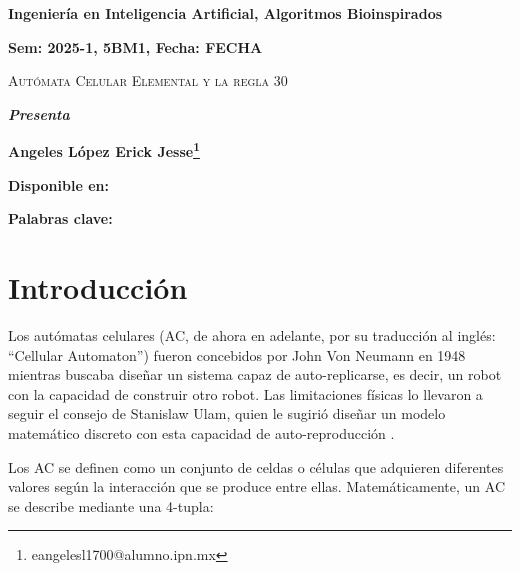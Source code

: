 \documentclass[12pt,twoside]{article}
\newcommand{\keywords}[1]{%
	\begin{center}
		\textbf{Palabras clave:} #1
	\end{center}
}
\begin{document}
	
	\centerline{\bf Ingeniería en Inteligencia Artificial, Algoritmos Bioinspirados}
	
	\centerline{\bf  Sem: 2025-1, 5BM1, Fecha: FECHA}
	
	\centerline{}
	
	
	
	\begin{center}
		\Large{\textsc{Autómata Celular Elemental y la regla 30}} 
	\end{center}
	\centerline{}
	\centerline{\bf {\textit{Presenta}}}
	\centerline{\bf {Angeles López Erick Jesse\footnote{eangelesl1700@alumno.ipn.mx}}}
	\centerline{}
	\centerline{}
	\centerline{\bf {Disponible en:}}
	\centerline{}
	
	
	
	
	\newtheorem{Theorem}{\quad Theorem}[section]
	
	\newtheorem{Definition}[Theorem]{\quad Definition}
	
	\newtheorem{Corollary}[Theorem]{\quad Corollary}
	
	\newtheorem{Lemma}[Theorem]{\quad Lemma}
	
	\newtheorem{Example}[Theorem]{\quad Example}
	
	\bigskip
	
	\bigskip
	
	\begin{abstract} 
		
	\end{abstract}
	
	\keywords{}
	
	\clearpage
	
	\tableofcontents
	\clearpage
		
	\section{Introducción}
	
	Los autómatas celulares (AC, de ahora en adelante, por su traducción al inglés: ``Cellular Automaton'') fueron concebidos por John Von Neumann en 1948 mientras buscaba diseñar un sistema capaz de auto-replicarse, es decir, un robot con la capacidad de construir otro robot. Las limitaciones físicas lo llevaron a seguir el consejo de Stanislaw Ulam, quien le sugirió diseñar un modelo matemático discreto con esta capacidad de auto-reproducción \cite{b1}.
	
	Los AC se definen como un conjunto de celdas o células que adquieren diferentes valores según la interacción que se produce entre ellas. Matemáticamente, un AC se describe mediante una 4-tupla:
	
\end{document}
